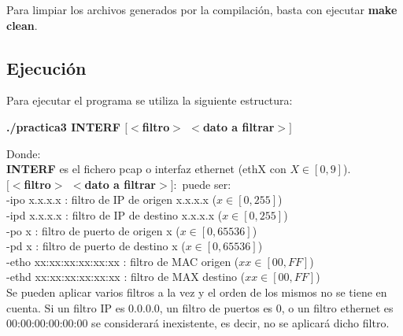 \documentclass[a4paper, 11pt]{article}	%
\begin{document}
Para limpiar los archivos generados por la compilación, basta con ejecutar \textbf{make clean}.

\subsection{Ejecución}
Para ejecutar el programa se utiliza la siguiente estructura:

\begin{center}
\textbf{./practica3 INTERF $[<$filtro$>$ $<$dato a filtrar$>]$}
\end{center}

\noindent Donde:\\
\textbf{INTERF} es el fichero pcap o interfaz ethernet (ethX con $X \in [0,9]$).\\
\textbf{$[<$filtro$>$ $<$dato a filtrar$>]:$} puede ser:\\
\indent -ipo x.x.x.x : filtro de IP de origen x.x.x.x ($x \in [0, 255]$)\\
\indent -ipd x.x.x.x : filtro de IP de destino x.x.x.x ($x \in [0, 255]$)\\
\indent -po x : filtro de puerto de origen x ($x \in [0,65536]$)\\
\indent -pd x : filtro de puerto de destino x ($x \in [0,65536]$)\\
\indent -etho xx:xx:xx:xx:xx:xx : filtro de MAC origen ($xx \in [00,FF]$)\\
\indent -ethd xx:xx:xx:xx:xx:xx : filtro de MAX destino ($xx \in [00,FF]$)\\

Se pueden aplicar varios filtros a la vez y el orden de los mismos no se tiene en cuenta.
Si un filtro IP es 0.0.0.0, un filtro de puertos es 0, o un filtro ethernet es 00:00:00:00:00:00 se considerará inexistente, es decir, no se aplicará dicho filtro.
\end{document}
